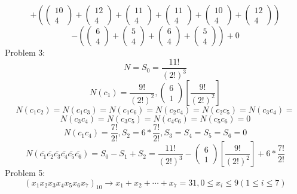 \documentclass{article}
\begin{document}
$$
+
\left(
\left(\begin{array}{c}
10\\
4
\end{array}\right)
+
\left(\begin{array}{c}
12\\
4
\end{array}\right)
+
\left(\begin{array}{c}
11\\
4
\end{array}\right)
+
\left(\begin{array}{c}
11\\
4
\end{array}\right)
+
\left(\begin{array}{c}
10\\
4
\end{array}\right)
+
\left(\begin{array}{c}
12\\
4
\end{array}\right)
\right)
$$
$$
-
\left(
\left(\begin{array}{c}
6\\
4
\end{array}\right)
+
\left(\begin{array}{c}
5\\
4
\end{array}\right)
+
\left(\begin{array}{c}
6\\
4
\end{array}\right)
+
\left(\begin{array}{c}
5\\
4
\end{array}\right)
\right)
+
0
$$
Problem 3:
$$
N=S_0=\frac{11!}{(2!)^3}
$$
$$
N(c_1)=\frac{9!}{(2!)^2}
,
\left(\begin{array}{c}
6\\
1
\end{array}\right)
\left[
\frac{9!}{(2!)^2}
\right]
$$
$$
N(c_1c_2)=N(c_1c_3)=N(c_1c_6)=N(c_2c_4)=N(c_2c_5)=N(c_3c_4)=
$$
$$
N(c_3c_4)=N(c_3c_5)=N(c_4c_6)=N(c_5c_6)=0
$$
$$
N(c_1c_4)=\frac{7!}{2!},S_2=6*\frac{7!}{2!},S_3=S_4=S_5=S_6=0
$$
$$
N(\bar{c_1}\bar{c_2}\bar{c_3}\bar{c_4}\bar{c_5}\bar{c_6})=S_0-S_1+S_2=\frac{11!}{(2!)^3}-
\left(\begin{array}{c}
6\\
1
\end{array}\right)
\left[
\frac{9!}{(2!)^2}
\right]
+
6*\frac{7!}{2!}
$$
Problem 5:
$$
(x_1x_2x_3x_4x_5x_6x_7)_10
\rightarrow
x_1+x_2+\cdots+x_7=31,0\leq x_i \leq 9(1\leq i\leq 7)
$$
\end{document}
